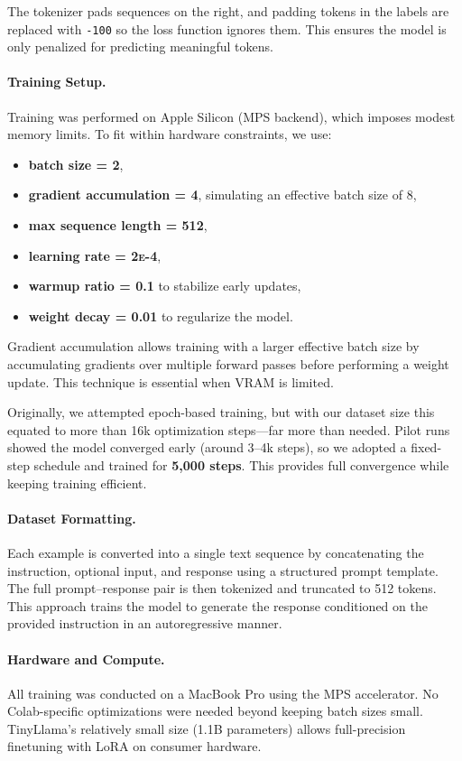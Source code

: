 \documentclass[11pt,a4paper]{article}
\begin{document}
The tokenizer pads sequences on the right, and padding tokens in the labels are replaced with \texttt{-100} so the loss function ignores them. This ensures the model is only penalized for predicting meaningful tokens.

\paragraph{Training Setup.}
Training was performed on Apple Silicon (MPS backend), which imposes modest memory limits. To fit within hardware constraints, we use:
\begin{itemize}
    \item \textbf{batch size = 2},
    \item \textbf{gradient accumulation = 4}, simulating an effective batch size of 8,
    \item \textbf{max sequence length = 512},
    \item \textbf{learning rate = 2\textsc{e}{-4}},
    \item \textbf{warmup ratio = 0.1} to stabilize early updates,
    \item \textbf{weight decay = 0.01} to regularize the model.
\end{itemize}

Gradient accumulation allows training with a larger effective batch size by accumulating gradients over multiple forward passes before performing a weight update. This technique is essential when VRAM is limited.

Originally, we attempted epoch-based training, but with our dataset size this equated to more than 16k optimization steps—far more than needed. Pilot runs showed the model converged early (around 3--4k steps), so we adopted a fixed-step schedule and trained for \textbf{5{,}000 steps}. This provides full convergence while keeping training efficient.

\paragraph{Dataset Formatting.}
Each example is converted into a single text sequence by concatenating the instruction, optional input, and response using a structured prompt template. The full prompt–response pair is then tokenized and truncated to 512 tokens. This approach trains the model to generate the response conditioned on the provided instruction in an autoregressive manner.

\paragraph{Hardware and Compute.}
All training was conducted on a MacBook Pro using the MPS accelerator. No Colab-specific optimizations were needed beyond keeping batch sizes small. TinyLlama’s relatively small size (1.1B parameters) allows full-precision finetuning with LoRA on consumer hardware.
\end{document}
